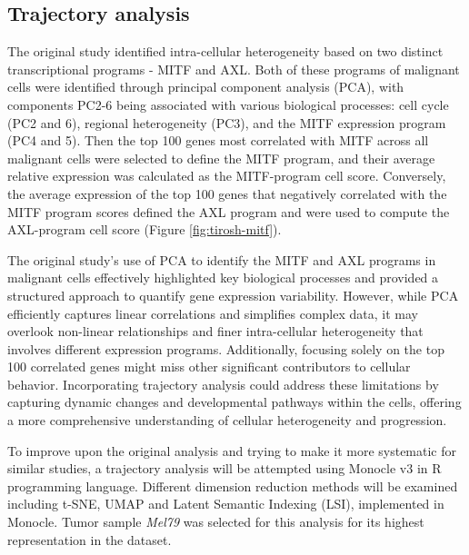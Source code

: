\documentclass[11pt]{article}
\begin{document}
\subsection{Trajectory analysis}
\begin{multicols}{2}
    
    \noindent
    The original study identified intra-cellular heterogeneity based on two distinct transcriptional programs - MITF and AXL. Both of these programs of malignant cells were identified through principal component analysis (PCA), with components PC2-6 being associated with various biological processes: cell cycle (PC2 and 6), regional heterogeneity (PC3), and the MITF expression program (PC4 and 5). Then the top 100 genes most correlated with MITF across all malignant cells were selected to define the MITF program, and their average relative expression was calculated as the MITF-program cell score. Conversely, the average expression of the top 100 genes that negatively correlated with the MITF program scores defined the AXL program and were used to compute the AXL-program cell score (Figure \ref{fig:tirosh-mitf}).

    The original study's use of PCA to identify the MITF and AXL programs in malignant cells effectively highlighted key biological processes and provided a structured approach to quantify gene expression variability. However, while PCA efficiently captures linear correlations and simplifies complex data, it may overlook non-linear relationships and finer intra-cellular heterogeneity that involves different expression programs. Additionally, focusing solely on the top 100 correlated genes might miss other significant contributors to cellular behavior. Incorporating trajectory analysis could address these limitations by capturing dynamic changes and developmental pathways within the cells, offering a more comprehensive understanding of cellular heterogeneity and progression.

    To improve upon the original analysis and trying to make it more systematic for similar studies, a trajectory analysis will be attempted using Monocle v3 in R programming language\cite{trapnell_dynamics_2014}. Different dimension reduction methods will be examined including t-SNE, UMAP and Latent Semantic Indexing (LSI), implemented in Monocle. Tumor sample \textit{Mel79} was selected for this analysis for its highest representation in the dataset.


\end{multicols}
\end{document}
